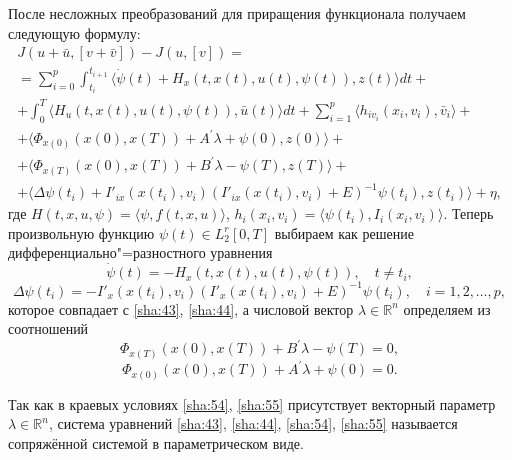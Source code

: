 \begin{mproof}
После несложных преобразований для приращения функционала получаем следующую формулу:
\begin{multline} \label{sha:51} 
J(u+\bar{u},[v+\bar{v}])-J(u,[v])= 
\\
=\sum_{i=0}^{p}\int_{t_{i}}^{t_{i+1}}\bigl\langle \dot{\psi}(t)+H_{x}(t,x(t),u(t),\psi(t)),z(t)\bigr\rangle dt+ 
\\
+\int_{0}^{T}\bigl\langle H_{u}(t,x(t),u(t),\psi(t)),\bar{u}(t)\bigr\rangle dt+
\sum_{i=1}^{p}\bigl\langle h_{iv_{i}}(x_{i},v_{i}),\bar{v}_{i}\bigr\rangle + 
\\
+\bigl\langle\Phi_{x(0)}(x(0),x(T))+A^{\prime}\lambda+\psi(0), z(0)\bigr\rangle +
\\
+\bigl\langle\Phi_{x(T)}(x(0),x(T))+B^{\prime}\lambda-\psi(T),z(T)\bigr\rangle +
\\
+\bigl\langle\Delta\psi(t_{i})+I'_{ix}(x(t_{i}),v_{i})(I'_{ix}(x(t_{i}),v_{i})+E)^{-1}\psi(t_{i}),z(t_{i})\bigr\rangle +\eta , 
\end{multline} 
где $H(t,x,u,\psi)=\langle\psi,f(t,x,u)\rangle$, $h_{i}(x_{i},v_{i})=\langle\psi(t_{i}),I_{i}(x_{i},v_{i})\rangle$. Теперь произвольную функцию $\psi(t)\in L_{2}^{r}[0, T]$ выбираем как решение дифференциально"=разностного уравнения
\begin{equation} \label{sha:52} 
\dot{\psi}(t)=-H_{x}(t,x(t),u(t),\psi(t)), \quad t\ne t_{i},  
\end{equation} 
\begin{equation} \label{sha:53} 
\Delta\psi(t_{i})=-I'_{x}(x(t_{i}),v_{i})(I'_{x}(x(t_{i}),v_{i})+E)^{-1}\psi(t_{i}) ,  \quad     i=1, 2, \dots, p, 
\end{equation} 
которое совпадает с \eqref{sha:43}, \eqref{sha:44}, а числовой вектор $\lambda \in \mathbb R^{n} $ определяем из соотношений
\begin{equation} \label{sha:54} 
\Phi_{x(T)}(x(0),x(T))+B^{\prime}\lambda-\psi(T)=0, 
\end{equation} 
\begin{equation} \label{sha:55} 
\Phi_{x(0)}(x(0),x(T))+A^{\prime}\lambda+\psi(0)=0.
\end{equation} 

\smallskip

\begin{remark}[2] Так как в краевых условиях \eqref{sha:54}, \eqref{sha:55} присутствует векторный параметр $\lambda \in \mathbb  R^{n} $, система уравнений \eqref{sha:43}, \eqref{sha:44}, \eqref{sha:54}, \eqref{sha:55}  называется сопряжённой системой в параметрическом виде. 
\end{remark}


\end{mproof}

